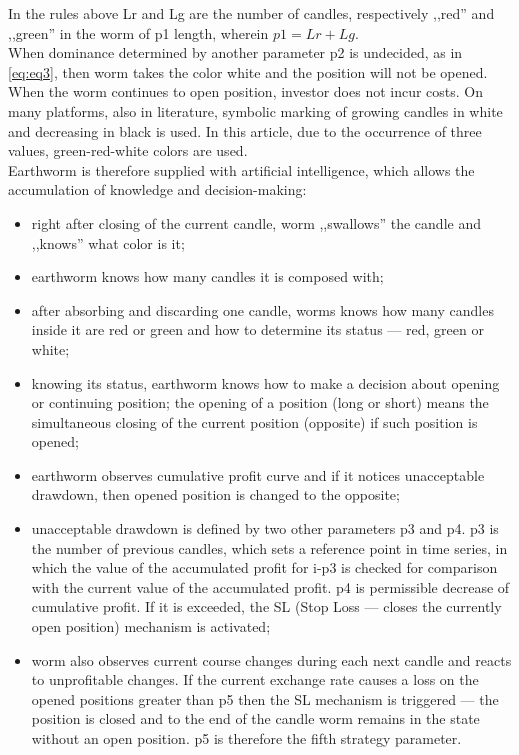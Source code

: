 \documentclass[runningheads,a4paper]{llncs}
\begin{document}
In the rules above Lr and Lg are the number of candles, respectively ,,red'' and ,,green'' in the worm of p1 length, wherein $p1 = Lr + Lg$.\\
When dominance determined by another parameter p2 is undecided, as in \ref{eq:eq3}, then worm takes the color white and the position will not be opened. When the worm continues to open position, investor does not incur costs. On many platforms, also in literature, symbolic marking of growing candles in white and decreasing in black is used. In this article, due to the occurrence of three values, green-red-white colors are used.\\

Earthworm is therefore supplied with artificial intelligence, which allows the accumulation of knowledge and decision-making:
\begin{itemize}
\item right after closing of the current candle, worm ,,swallows'' the candle and ,,knows'' what color is it;
\item earthworm knows how many candles it is composed with;
\item after absorbing and discarding one candle, worms knows how many candles inside it are red or green and how to determine its status --- red, green or white;
\item knowing its status, earthworm knows how to make a decision about opening or continuing position; the opening of a position (long or short) means the simultaneous closing of the current position (opposite) if such position is opened;
\item earthworm observes cumulative profit curve and if it  notices unacceptable drawdown, then opened position is changed to the opposite;
\item unacceptable drawdown is defined by two other parameters p3 and p4. p3 is the number of previous candles, which sets a reference point in time series, in which the value of the accumulated profit for i-p3 is checked for comparison with the current value of the accumulated profit. p4 is permissible decrease of cumulative profit. If it is exceeded, the SL (Stop Loss --- closes the currently open position) mechanism is activated;
\item worm also observes current course changes during  each next candle and reacts to unprofitable changes. If the current exchange rate causes a loss on the opened positions greater than p5 then the SL mechanism is triggered --- the position is closed and to the end of the candle worm remains in the state without an open position. p5 is therefore the fifth strategy parameter. 
\end{itemize}
\end{document}
